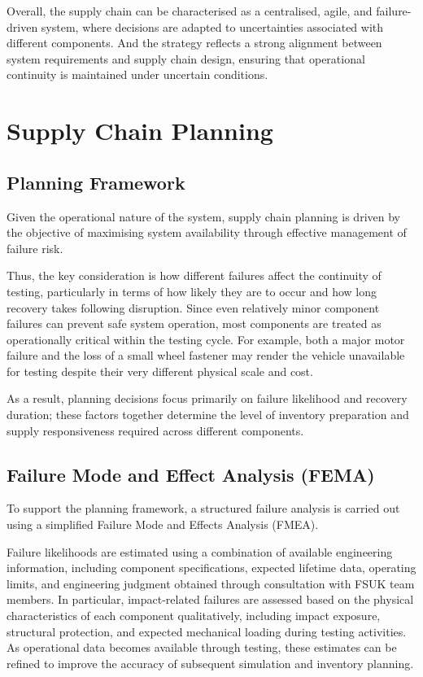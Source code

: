 \documentclass[11pt, a4paper]{report}
\numberwithin{equation}{section}
\begin{document}
\begin{refsection}
Overall, the supply chain can be characterised as a centralised, agile, and failure-driven system, where decisions are adapted to uncertainties associated with different components. And the strategy reflects a strong alignment between system requirements and supply chain design, ensuring that operational continuity is maintained under uncertain conditions.

\section{Supply Chain Planning}
\label{sec:supply_chain_planning}

\subsection{Planning Framework}%
\label{subsec:supply_chain_planning_framework}

Given the operational nature of the system, supply chain planning is driven by the objective of maximising system availability through effective management of failure risk.

Thus, the key consideration is how different failures affect the continuity of testing, particularly in terms of how likely they are to occur and how long recovery takes following disruption. Since even relatively minor component failures can prevent safe system operation, most components are treated as operationally critical within the testing cycle. For example, both a major motor failure and the loss of a small wheel fastener may render the vehicle unavailable for testing despite their very different physical scale and cost.

As a result, planning decisions focus primarily on failure likelihood and recovery duration; these factors together determine the level of inventory preparation and supply responsiveness required across different components.

\subsection{Failure Mode and Effect Analysis (FEMA)}

To support the planning framework, a structured failure analysis is carried out using a simplified Failure Mode and Effects Analysis (FMEA)\cite{FMEA_lecture_notes}\cite{fmea_supplychain}.

Failure likelihoods are estimated using a combination of available engineering information, including component specifications, expected lifetime data, operating limits, and engineering judgment obtained through consultation with FSUK team members. In particular, impact-related failures are assessed based on the physical characteristics of each component qualitatively, including impact exposure, structural protection, and expected mechanical loading during testing activities. As operational data becomes available through testing, these estimates can be refined to improve the accuracy of subsequent simulation and inventory planning.


\end{refsection}
\end{document}
